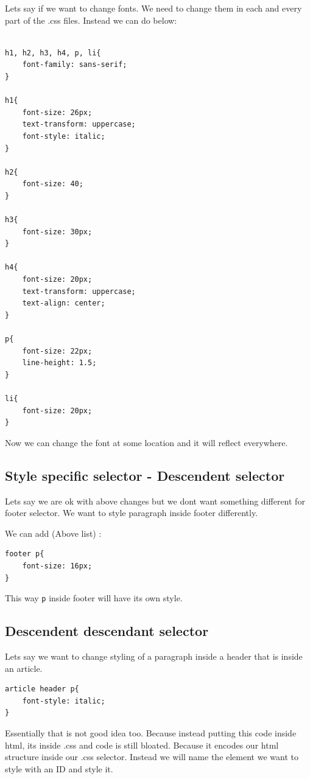 \documentclass[11pt]{article}
\begin{document}
Lets say if we want to change fonts. We need to change them in each and every part of the .css files. Instead we can do below:

\begin{verbatim}

h1, h2, h3, h4, p, li{
    font-family: sans-serif;
}

h1{
    font-size: 26px;
    text-transform: uppercase;
    font-style: italic;
}

h2{
    font-size: 40;
}

h3{
    font-size: 30px;
}

h4{
    font-size: 20px;
    text-transform: uppercase;
    text-align: center;
}

p{
    font-size: 22px;
    line-height: 1.5;
}

li{
    font-size: 20px;
}
\end{verbatim}

Now we can change the font at some location and it will reflect everywhere.
\subsection{Style specific selector - Descendent selector}
\label{sec:org85878bf}

Lets say we are ok with above changes but we dont want something different for footer selector. We want to style paragraph inside footer differently.

We can add (Above list) :

\begin{verbatim}
footer p{
    font-size: 16px;
}
\end{verbatim}

This way \texttt{p} inside footer will have its own style. 
\subsection{Descendent descendant selector}
\label{sec:org3ad416e}
Lets say we want to change styling of a paragraph inside a header that is inside an article.

\begin{verbatim}
article header p{
    font-style: italic;
}
\end{verbatim}

Essentially that is not good idea too. Because instead putting this code inside html, its inside .css and code is still bloated. Because it encodes our html structure inside our .css selector. Instead we will name the element we want to style with an ID and style it.
\end{document}
